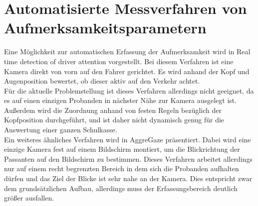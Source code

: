 \section{Automatisierte Messverfahren von Aufmerksamkeitsparametern}
\label{other_Messverfahren}
Eine Möglichkeit zur automatischen Erfassung der Aufmerksamkeit wird in \glqq Real time detection of driver attention\grqq\cite{driverAttention} vorgestellt. Bei diesem Verfahren ist eine Kamera direkt von vorn auf den Fahrer gerichtet. Es wird anhand der Kopf und Augenposition bewertet, ob dieser aktiv auf den Verkehr achtet.\\
Für die aktuelle Problemstellung ist dieses Verfahren allerdings nicht geeignet, da es auf einen einzigen Probanden in nächster Nähe zur Kamera ausgelegt ist. Außerdem wird die Zuordnung anhand von festen Regeln bezüglich der Kopfposition durchgeführt, und ist daher nicht dynamisch genug für die Auswertung einer ganzen Schulkasse.\\ 
Ein weiteres ähnliches Verfahren wird in \glqq AggreGaze\grqq \cite{AggreGaze} präsentiert. Dabei wird eine einzige Kamera fest auf einem Bildschirm montiert, um die Blickrichtung der Passanten auf den Bildschirm zu bestimmen. Dieses Verfahren arbeitet allerdings nur auf einem recht begrenzten Bereich in dem sich die Probanden aufhalten dürfen und das Ziel der Blicke ist sehr nahe an der Kamera. Dies entspricht zwar dem grundsätzlichen Aufbau, allerdings muss der Erfassungsbereich deutlich größer ausfallen.